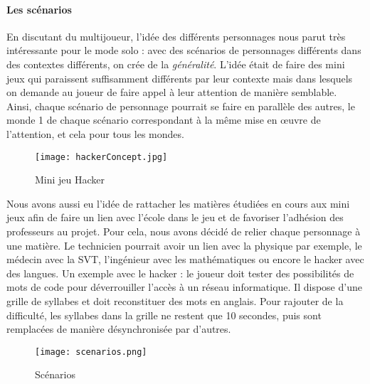 \newpage
\paragraph{Les scénarios}En discutant du multijoueur, l'idée des différents personnages nous parut très intéressante pour le mode solo : avec des scénarios de personnages différents
dans des contextes différents, on crée de la \emph{généralité}. L'idée était de faire des mini jeux qui paraissent suffisamment différents par leur contexte mais dans lesquels on
demande au joueur de faire appel à leur attention de manière semblable. Ainsi, chaque scénario de personnage pourrait se faire en parallèle des autres, le monde 1 de chaque scénario
correspondant à la même mise en œuvre de l'attention, et cela pour tous les mondes. 

\begin{wrapfigure}[11]{l}{6cm}
    \vspace{-25pt}
    \begin{center}
    \texttt{[image: hackerConcept.jpg]}
    \end{center}
    \captionsetup{labelformat=simpleNumber}
    \caption{Mini jeu Hacker}
\label{Hacker}
\end{wrapfigure}

Nous avons aussi eu l'idée de rattacher les matières étudiées en cours aux mini jeux afin de faire un lien avec l'école dans le jeu et de favoriser l'adhésion des professeurs au projet.
Pour cela, nous avons décidé de relier chaque personnage à une matière. Le technicien pourrait avoir un lien avec la physique par exemple, le médecin avec la SVT, l'ingénieur avec les
mathématiques ou encore le hacker avec des langues. Un exemple avec le hacker : le joueur doit tester des possibilités de mots de code pour déverrouiller l'accès à un réseau
informatique. Il dispose d'une grille de syllabes et doit reconstituer des mots en anglais. Pour rajouter de la difficulté, les syllabes dans la grille ne restent que 10 secondes, puis
sont remplacées de manière désynchronisée par d'autres.

\begin{figure}[H]
    \begin{center}
    \texttt{[image: scenarios.png]}
    \end{center}
    \caption{Scénarios}
\label{Scenarios}
\end{figure}